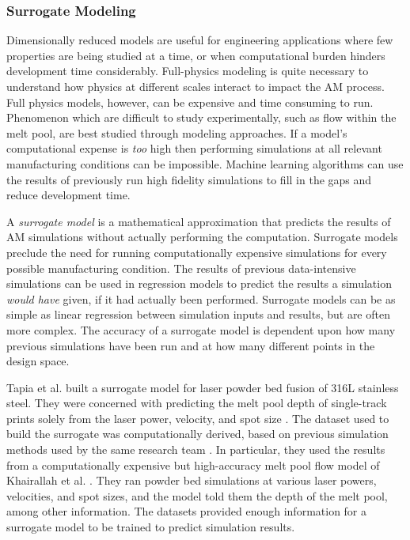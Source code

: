 \subsubsection{Surrogate Modeling}
Dimensionally reduced models are useful for engineering applications where few properties are being studied at a time, or when computational burden hinders development time considerably. Full-physics modeling is quite necessary to understand how physics at different scales interact to impact the AM process. Full physics models, however, can be expensive and time consuming to run. Phenomenon which are difficult to study experimentally, such as flow within the melt pool, are best studied through modeling approaches. If a model's computational expense is \textit{too} high then performing simulations at all relevant manufacturing conditions can be impossible. Machine learning algorithms can use the results of previously run high fidelity simulations to fill in the gaps and reduce development time.

A \textit{surrogate model} is a mathematical approximation that predicts the results of AM simulations without actually performing the computation. Surrogate models preclude the need for running computationally expensive simulations for every possible manufacturing condition. The results of previous data-intensive simulations can be used in regression models to predict the results a simulation \textit{would have} given, if it had actually been performed. Surrogate models can be as simple as linear regression between simulation inputs and results, but are often more complex. The accuracy of a surrogate model is dependent upon how many previous simulations have been run and at how many different points in the design space.

Tapia et al. built a surrogate model for laser powder bed fusion of 316L stainless steel. They were concerned with predicting the melt pool depth of single-track prints solely from the laser power, velocity, and spot size \cite{Tapia2017}. The dataset used to build the surrogate was computationally derived, based on previous simulation methods used by the same research team \cite{King2014}. In particular, they used the results from a computationally expensive but high-accuracy melt pool flow model of Khairallah et al. \cite{Khairallah2016}. They ran powder bed simulations at various laser powers, velocities, and spot sizes, and the model told them the depth of the melt pool, among other information. The datasets provided enough information for a surrogate model to be trained to predict simulation results.

